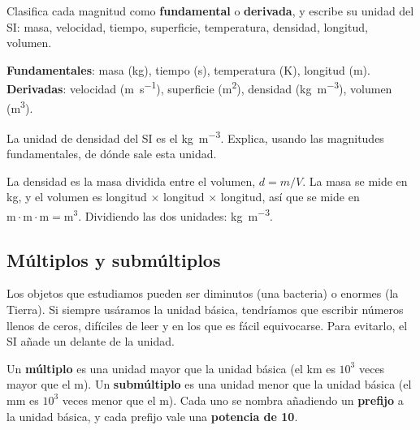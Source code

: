 \begin{exercise}
    Clasifica cada magnitud como \textbf{fundamental} o \textbf{derivada}, y escribe su unidad del SI: masa, velocidad, tiempo, superficie, temperatura, densidad, longitud, volumen.
    \begin{solu}
        \textbf{Fundamentales}: masa (\unit{\kg}), tiempo (\unit{\s}), temperatura (\unit{\K}), longitud (\unit{\m}). \\
        \textbf{Derivadas}: velocidad (\unit{\m\per\s}), superficie (\unit{\square\m}), densidad (\unit{\kg\per\cubic\m}), volumen (\unit{\cubic\m}).
    \end{solu}
\end{exercise}

\begin{exercise}
    La unidad de densidad del SI es el \unit{\kg\per\cubic\m}. Explica, usando las magnitudes fundamentales, de dónde sale esta unidad.
    \begin{solu}
        La densidad es la masa dividida entre el volumen, \(d = m/V\). La masa se mide en \unit{\kg}, y el volumen es longitud \(\times\) longitud \(\times\) longitud, así que se mide en \(\unit{\m}\cdot\unit{\m}\cdot\unit{\m} = \unit{\cubic\m}\). Dividiendo las dos unidades: \unit{\kg\per\cubic\m}.
    \end{solu}
\end{exercise}


\subsection{Múltiplos y submúltiplos}

Los objetos que estudiamos pueden ser diminutos (una bacteria) o enormes (la Tierra). Si siempre usáramos la unidad básica, tendríamos que escribir números llenos de ceros, difíciles de leer y en los que es fácil equivocarse. Para evitarlo, el SI añade un  delante de la unidad.

\begin{definition}
    Un \textbf{múltiplo} es una unidad mayor que la unidad básica (el \unit{\km} es \(10^{3}\) veces mayor que el \unit{\m}). Un \textbf{submúltiplo} es una unidad menor que la unidad básica (el \unit{\mm} es \(10^{3}\) veces menor que el \unit{\m}). Cada uno se nombra añadiendo un \textbf{prefijo} a la unidad básica, y cada prefijo vale una \textbf{potencia de 10}.
\end{definition}

